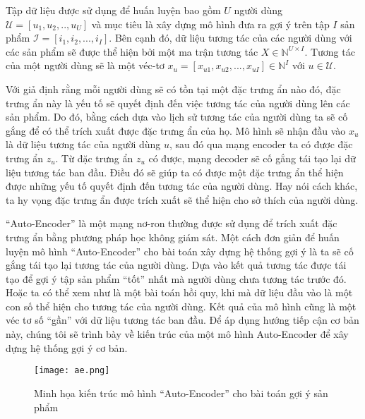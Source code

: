 

   Tập dữ liệu được sử dụng để huấn luyện bao gồm $U$ người dùng $\mathcal{U} = [u_1,u_2, .., u_U]$ và mục tiêu là xây dựng mô hình đưa ra gợi ý trên tập $I$ sản phẩm $\mathcal{I} = [i_1,i_2, ..., i_I]$. 
    Bên cạnh đó, dữ liệu tương tác của các người dùng với các sản phẩm sẽ được thể hiện bởi một ma trận tương tác $X \in \mathbb{N}^{U\times I}$. 
    Tương tác của một người dùng sẽ là một véc-tơ $x_u = [x_{u1}, x_{u2}, ..., x_{uI}] \in \mathbb{N}^I $ với $u \in \mathcal{U}$.
    
    Với giả định rằng mỗi người dùng sẽ có tồn tại một đặc trưng ẩn nào đó, đặc trưng ẩn này là yếu tố sẽ quyết định đến việc tương tác của người dùng lên các sản phẩm.
    Do đó, bằng cách dựa vào lịch sử tương tác của người dùng ta sẽ cố gắng để có thể trích xuất được đặc trưng ẩn của họ.
    Mô hình sẽ nhận đầu vào $x_u$ là dữ liệu tương tác của người dùng $u$, sau đó qua mạng encoder ta có được đặc trưng ẩn $z_u$.
    Từ đặc trưng ẩn $z_u$ có được, mạng decoder sẽ cố gắng tái tạo lại dữ liệu tương tác ban đầu.
    Điều đó sẽ giúp ta có được một đặc trưng ẩn thể hiện được những yếu tố quyết định đến tương tác của người dùng.
    Hay nói cách khác, ta hy vọng đặc trưng ẩn được trích xuất sẽ thể hiện cho sở thích của người dùng. 

    ``Auto-Encoder'' là một mạng nơ-ron thường được sử dụng để trích xuất đặc trưng ẩn bằng phương pháp học không giám sát.
    Một cách đơn giản để huấn luyện mô hình ``Auto-Encoder'' cho bài toán xây dựng hệ thống gợi ý là ta sẽ cố gắng tái tạo lại tương tác của người dùng.
    Dựa vào kết quả tương tác được tái tạo để gợi ý tập sản phẩm ``tốt'' nhất mà người dùng chưa tương tác trước đó. 
    Hoặc ta có thể xem như là một bài toán hồi quy, khi mà dữ liệu đầu vào là một con số thể hiện cho tương tác của người dùng.
    Kết quả của mô hình cũng là một véc tơ số ``gần'' với dữ liệu tương tác ban đầu.  
    Để áp dụng hướng tiếp cận cơ bản này, chúng tôi sẽ trình bày về kiến trúc của một mô hình Auto-Encoder để xây dựng hệ thống gợi ý cơ bản.
    \begin{figure}
        \centering
        \texttt{[image: ae.png]}
        \caption{Minh họa kiến trúc mô hình ``Auto-Encoder'' cho bài toán gợi ý sản phẩm}
        \label{fig_recae}
    \end{figure}

